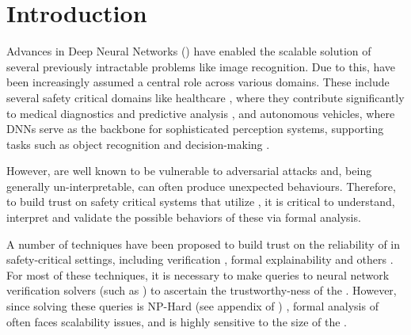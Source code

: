 
\section{Introduction}


Advances in Deep Neural Networks (\dnn) have enabled the scalable solution
of several previously intractable problems like image recognition. Due to this, \dnn have been increasingly assumed a central role
across various domains. These include several safety critical domains like
healthcare \cite{b1}, where they contribute significantly to medical diagnostics
and predictive analysis \cite{b2}, and autonomous vehicles, where DNNs serve as
the backbone for sophisticated perception systems, supporting tasks such as
object recognition and decision-making \cite{b3}. 

However, \dnn are well known to be vulnerable to adversarial attacks  and, being generally un-interpretable, can often produce unexpected
behaviours. Therefore, to build trust on safety critical systems that utilize
\dnn, it is  critical to understand, interpret and validate
the possible behaviors of these \dnn via formal analysis. 

A number of techniques have been proposed to build trust on the reliability
of \dnn in safety-critical settings, including verification \cite{reluplex,
deeppoly} , formal explainability \cite{overview-fxai,
minimal-image-fxai} and others . For most of these
techniques, it is necessary to make queries to neural network verification
solvers (such as \cite{reluplex}) to ascertain the trustworthy-ness of the \dnn.
 However, since solving these queries is NP-Hard (see appendix of
\cite{reluplex}) , formal analysis of \dnn
often faces scalability issues, and is highly sensitive to the size of the \dnn.

